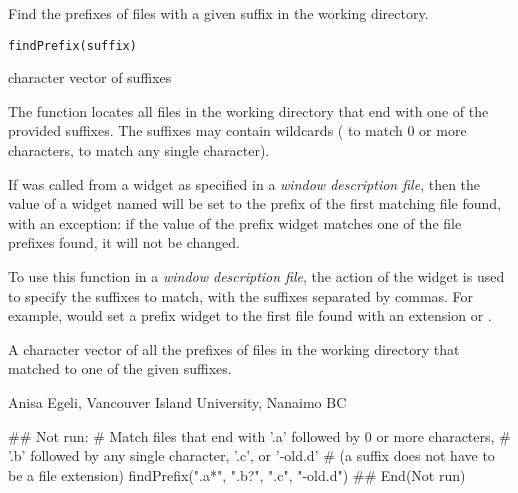 \documentclass[letterpaper]{book}
\begin{document}
\begin{Description}\relax
Find the prefixes of files with a given suffix in the working directory.
\end{Description}
\begin{Usage}
\begin{verbatim}
findPrefix(suffix)
\end{verbatim}
\end{Usage}
\begin{Arguments}
\begin{ldescription}
\item[\code{suffix}] character vector of suffixes
\end{ldescription}
\end{Arguments}
\begin{Details}\relax
The function  locates all files in the working directory that end with
one of the provided suffixes. The suffixes may contain wildcards ( to match 0
or more characters,  to match any single character).

If  was called from a widget as specified in a 
\emph{window description file}, then the value of a widget named 
 will be set to the prefix of the first matching file 
found, with an exception: if the value of the prefix widget
matches one of the file prefixes found, it will not be changed.

To use this function in a \emph{window description file}, the action of the widget is
used to specify the suffixes to match, with the suffixes separated by commas.
For example,  would set a prefix widget to the first file found
with an extension  or .
\end{Details}
\begin{Value}
A character vector of all the prefixes of files in the working directory that
matched to one of the given suffixes.
\end{Value}
\begin{Author}\relax
Anisa Egeli, Vancouver Island University, Nanaimo BC
\end{Author}
\begin{SeeAlso}\relax
{}
\end{SeeAlso}
\begin{Examples}
\begin{ExampleCode}
## Not run: 
# Match files that end with '.a' followed by 0 or more characters,
# '.b' followed by any single character, '.c', or '-old.d'
# (a suffix does not have to be a file extension)
findPrefix(".a*", ".b?", ".c", "-old.d")
## End(Not run)
\end{ExampleCode}
\end{Examples}
\end{document}
